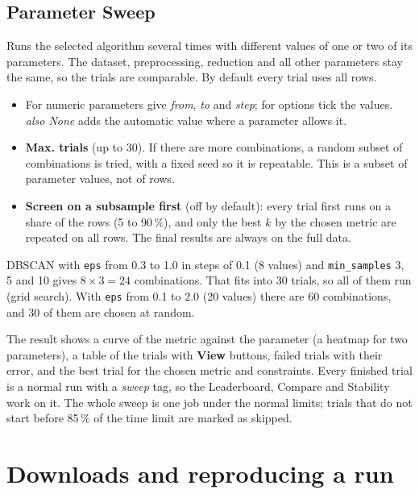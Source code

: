 \documentclass[11pt,a4paper]{article}
\newcommand{\ui}[1]{\textsf{\textbf{#1}}}   %
\newcommand{\param}[1]{\texttt{#1}}         %
\begin{document}
\subsection{Parameter Sweep}

Runs the selected algorithm several times with different values of one or two of its parameters. The dataset,
preprocessing, reduction and all other parameters stay the same, so the trials are comparable. By default every
trial uses all rows.

\begin{itemize}
  \item For numeric parameters give \emph{from}, \emph{to} and \emph{step}; for options tick the values. \emph{also
    None} adds the automatic value where a parameter allows it.
  \item \ui{Max. trials} (up to 30). If there are more combinations, a random subset of combinations is tried, with a
    fixed seed so it is repeatable. This is a subset of parameter values, not of rows.
  \item \ui{Screen on a subsample first} (off by default): every trial first runs on a share of the rows (5 to
    90\,\%), and only the best $k$ by the chosen metric are repeated on all rows. The final results are always on
    the full data.
\end{itemize}

\begin{example}
DBSCAN with \param{eps} from 0.3 to 1.0 in steps of 0.1 (8 values) and \param{min\_samples} 3, 5 and 10 gives
$8\times3=24$ combinations. That fits into 30 trials, so all of them run (grid search). With \param{eps} from 0.1 to
2.0 (20 values) there are 60 combinations, and 30 of them are chosen at random.
\end{example}

The result shows a curve of the metric against the parameter (a heatmap for two parameters), a table of the trials
with \ui{View} buttons, failed trials with their error, and the best trial for the chosen metric and constraints.
Every finished trial is a normal run with a \emph{sweep} tag, so the Leaderboard, Compare and Stability work on it.
The whole sweep is one job under the normal limits; trials that do not start before 85\,\% of the time limit are
marked as skipped.

\section{Downloads and reproducing a run}
\end{document}
